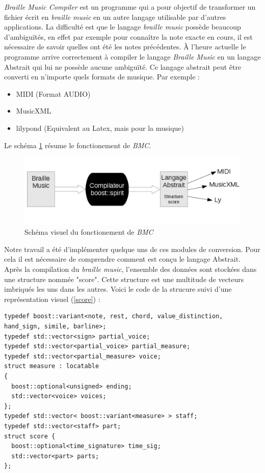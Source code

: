 
\textit{Braille Music Compiler} est un programme qui a pour objectif
de transformer un fichier écrit en \textit{braille music} en un autre
langage utilisable par d'autres applications. La difficulté est que le
langage \textit{braille music} possède beaucoup d'ambiguïtés, en effet
par exemple pour connaître la note exacte en cours, il est nécessaire
de savoir quelles ont été les notes précédentes. \`A l'heure actuelle
le programme arrive correctement à compiler le langage \textit{Braille
  Music} en un langage Abstrait qui lui ne possède aucune
ambiguïté. Ce langage abstrait peut être converti en n'importe quels
formats de musique. Par exemple :

\begin{itemize}
\item MIDI (Format AUDIO)
\item MusicXML 
\item lilypond (Equivalent au Latex, mais pour la musique)
\end{itemize}
Le schéma \ref{compiler} résume le fonctionement de \textit{BMC}.

\begin{figure}[!h]
  \centering
  \includegraphics[width=1\textwidth]{images/fonction-bmc.png}
  \caption{Schéma visuel du fonctionement de \textit{BMC}}
  \label{compiler}
\end{figure}

Notre travail a été d'implémenter quelque uns de ces modules de
conversion. Pour cela il est nécessaire de comprendre comment est
conçu le langage Abstrait. Après la compilation du \textit{braille music}, l'ensemble des données sont stockées dans une structure
nommée "score". Cette structure est une multitude de vecteurs
imbriqués les uns dans les autres. Voici le code de la strucure suivi
d'une représentation visuel (\ref{score}) :

\begin{verbatim}
typedef boost::variant<note, rest, chord, value_distinction, hand_sign, simile, barline>;
typedef std::vector<sign> partial_voice;
typedef std::vector<partial_voice> partial_measure;
typedef std::vector<partial_measure> voice;
struct measure : locatable
{
  boost::optional<unsigned> ending;
  std::vector<voice> voices;
};
typedef std::vector< boost::variant<measure> > staff;
typedef std::vector<staff> part;
struct score {
  boost::optional<time_signature> time_sig;
  std::vector<part> parts;
};
\end{verbatim}

